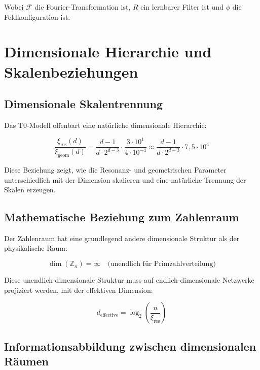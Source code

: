 \documentclass[12pt,a4paper]{article}
\newcommand{\xipar}{\ensuremath{\xi}}
\begin{document}
	Wobei $\mathcal{F}$ die Fourier-Transformation ist, $R$ ein lernbarer Filter ist und $\phi$ die Feldkonfiguration ist.
	
	\section{Dimensionale Hierarchie und Skalenbeziehungen}
	\label{sec:dimensional_hierarchy}
	
	\subsection{Dimensionale Skalentrennung}
	\label{subsec:scale_separation}
	
	Das T0-Modell offenbart eine natürliche dimensionale Hierarchie:
	
	\begin{equation}
		\frac{\xipar_{\text{res}}(d)}{\xipar_{\text{geom}}(d)} = \frac{d-1}{d \cdot 2^{d-3}} \cdot \frac{3 \cdot 10^1}{4 \cdot 10^{-4}} \approx \frac{d-1}{d \cdot 2^{d-3}} \cdot 7,5 \cdot 10^4
	\end{equation}
	
	Diese Beziehung zeigt, wie die Resonanz- und geometrischen Parameter unterschiedlich mit der Dimension skalieren und eine natürliche Trennung der Skalen erzeugen.
	
	\subsection{Mathematische Beziehung zum Zahlenraum}
	\label{subsec:zahlenraum_relation}
	
	Der Zahlenraum hat eine grundlegend andere dimensionale Struktur als der physikalische Raum:
	
	\begin{equation}
		\dim(\mathbb{Z}_n) = \infty \quad \text{(unendlich für Primzahlverteilung)}
	\end{equation}
	
	Diese unendlich-dimensionale Struktur muss auf endlich-dimensionale Netzwerke projiziert werden, mit der effektiven Dimension:
	
	\begin{equation}
		d_{\text{effective}} = \log_2\left(\frac{n}{\xipar_{\text{res}}}\right)
	\end{equation}
	
	\subsection{Informationsabbildung zwischen dimensionalen Räumen}
	\label{subsec:information_mapping}
	
\end{document}
